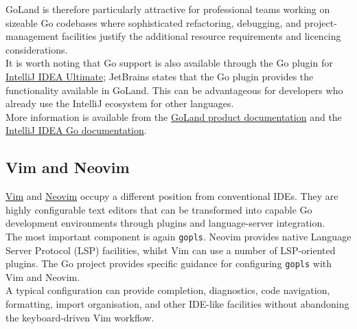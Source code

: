 GoLand is therefore particularly attractive for professional teams working on sizeable Go codebases where sophisticated refactoring, debugging, and project-management facilities justify the additional resource requirements and licencing considerations.\\

It is worth noting that Go support is also available through the Go plugin for
\href{https://www.jetbrains.com/idea/}{IntelliJ IDEA Ultimate}; JetBrains states that the Go plugin provides the functionality available in GoLand. This can be advantageous for developers who already use the IntelliJ ecosystem for other languages.\\

More information is available from the
\href{https://www.jetbrains.com/go/}{GoLand product documentation}
and the
\href{https://www.jetbrains.com/help/idea/go-plugin.html}{IntelliJ IDEA Go documentation}.

\subsection{Vim and Neovim}

\href{https://www.vim.org/}{Vim} and
\href{https://neovim.io/}{Neovim} occupy a different position from conventional IDEs. They are highly configurable text editors that can be transformed into capable Go development environments through plugins and language-server integration.\\

The most important component is again \texttt{gopls}. Neovim provides native Language Server Protocol (LSP) facilities, whilst Vim can use a number of LSP-oriented plugins. The Go project provides specific guidance for configuring \texttt{gopls} with Vim and Neovim.\\

A typical configuration can provide completion, diagnostics, code navigation, formatting, import organisation, and other IDE-like facilities without abandoning the keyboard-driven Vim workflow.

